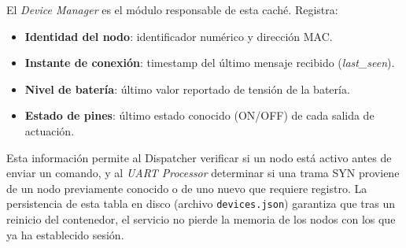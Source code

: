El \textit{Device Manager} es el módulo responsable de esta caché. Registra:
\begin{itemize}[leftmargin=*, label=--]
    \item \textbf{Identidad del nodo}: identificador numérico y dirección MAC.
    \item \textbf{Instante de conexión}: timestamp del último mensaje recibido (\textit{last\_seen}).
    \item \textbf{Nivel de batería}: último valor reportado de tensión de la batería.
    \item \textbf{Estado de pines}: último estado conocido (ON/OFF) de cada salida de actuación.
\end{itemize}

Esta información permite al Dispatcher verificar si un nodo está activo antes de enviar 
un comando, y al \textit{UART Processor} determinar si una trama SYN proviene de un nodo 
previamente conocido o de uno nuevo que requiere registro. La persistencia de esta tabla 
en disco (archivo \texttt{devices.json}) garantiza que tras un reinicio del contenedor, 
el servicio no pierde la memoria de los nodos con los que ya ha establecido sesión.
